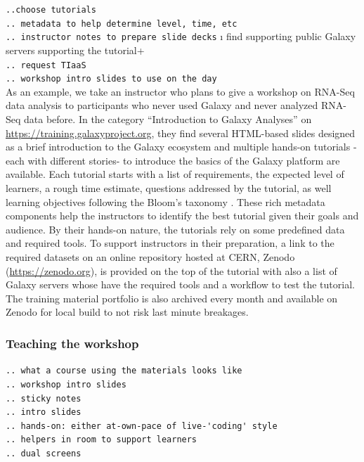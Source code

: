 \documentclass[10pt,letterpaper]{article}
\begin{document}
\verb+..choose tutorials+ \\
\verb+.. metadata to help determine level, time, etc+ \\
\verb+.. instructor notes to prepare slide decks+ \i
\verb.. find supporting public Galaxy servers supporting the tutorial+ \\
\verb+.. request TIaaS+ \\
\verb+.. workshop intro slides to use on the day+ \\


As an example, we take an instructor who plans to give a workshop on RNA-Seq data analysis to participants who never used Galaxy and never analyzed RNA-Seq data before.
In the category “Introduction to Galaxy Analyses” on \url{https://training.galaxyproject.org}, they find several HTML-based slides designed as a brief introduction to the Galaxy ecosystem and multiple hands-on tutorials -each with different stories- to introduce the basics of the Galaxy platform are available.
Each tutorial starts with a list of requirements, the expected level of learners, a rough time estimate, questions addressed by the tutorial, as well learning objectives following the Bloom’s taxonomy \cite{TODO}.
These rich metadata components help the instructors to identify the best tutorial given their goals and audience.
By their hands-on nature, the tutorials rely on some predefined data and required tools.
To support instructors in their preparation, a link to the required datasets on an online repository hosted at CERN, Zenodo (\url{https://zenodo.org}), is provided on the top of the tutorial with also a list of Galaxy servers whose have the required tools and a workflow to test the tutorial.
The training material portfolio is also archived every month and available on Zenodo for local build to not risk last minute breakages.

\subsubsection*{Teaching the workshop}

\verb+.. what a course using the materials looks like+ \\
\verb+.. workshop intro slides+ \\
\verb+.. sticky notes+ \\
\verb+.. intro slides+ \\
\verb+.. hands-on: either at-own-pace of live-'coding' style+ \\
\verb+.. helpers in room to support learners+ \\
\verb+.. dual screens+ \\
\end{document}
